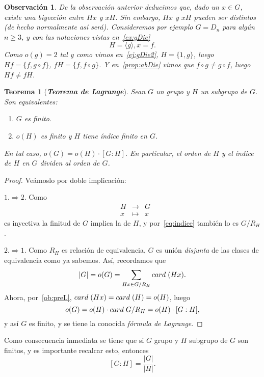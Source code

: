\documentclass[12pt]{article}
\newtheorem{theorem}{Teorema}[section]
\newtheorem{observation}{Observación}[theorem]
\begin{document}
\begin{observation}\label{ob:obNoBiy} De la observación anterior deducimos que, dado un $x \in G$, existe una biyección entre $Hx$ y $xH$. Sin embargo, $Hx$ y $xH$ pueden ser distintos (de hecho normalmente así será). Consideremos por ejemplo $G = D_n$ para algún $n \geq 3$, y con las notaciones vistas en~\ref{ex:gDie} $$H = \langle g \rangle, x = f.$$ Como $o(g) = 2$ tal y como vimos en~\ref{ej:gDie2}, $H = \lbrace 1,g \rbrace$, luego $Hf = \lbrace f, g \circ f \rbrace$, $fH = \lbrace f, f \circ g \rbrace$. Y en~\ref{prop:abDie} vimos que $f \circ g \neq g \circ f$, luego $Hf \neq fH$.
\end{observation}

\begin{theorem}[\textbf{\textit{Teorema de Lagrange}}]
Sean $G$ un grupo y $H$ un subgrupo de $G$. Son equivalentes:
\begin{enumerate}
\item $G$ es finito.
\item $o(H)$ es finito y $H$ tiene índice finito en $G$.
\end{enumerate}
En tal caso, $o(G) = o(H) \cdot [G:H]$. En particular, el orden de $H$ y el índice de $H$ en $G$ dividen al orden de $G$.
\end{theorem}
\begin{proof}
Veámoslo por doble implicación:

$1. \Rightarrow 2.$ Como $$\begin{array}{rccl}
&H & \longrightarrow & G\\
&x & \longmapsto &x
\end{array}$$ es inyectiva la finitud de $G$ implica la de $H$, y por~\ref{eq:indice} también lo es $G/R_{H}$.

$2. \Rightarrow 1.$ Como $R_{H}$ es relación de equivalencia, $G$ es unión \textit{disjunta} de las clases de equivalencia como ya sabemos. Así, recordamos que $$|G| = o(G) = \sum_{Hx\in G/R_{H}} card \hspace{0.1cm} (Hx).$$ Ahora, por~\ref{ob:preL}, $card \hspace{0.1cm} (Hx) = card \hspace{0.1cm} (H) = o(H)$, luego $$o(G) = o(H) \cdot card \hspace{0.1cm} G/R_{H} = o(H) \cdot [G: H],$$ y así $G$ es finito, y se tiene la conocida \textit{fórmula de Lagrange}.

\end{proof}

Como consecuencia inmediata se tiene que si $G$ grupo y $H$ subgrupo de $G$ son finitos, y es importante recalcar esto, entonces $$\left[ G:H \right] = \frac{|G|}{|H|}.$$
\end{document}
